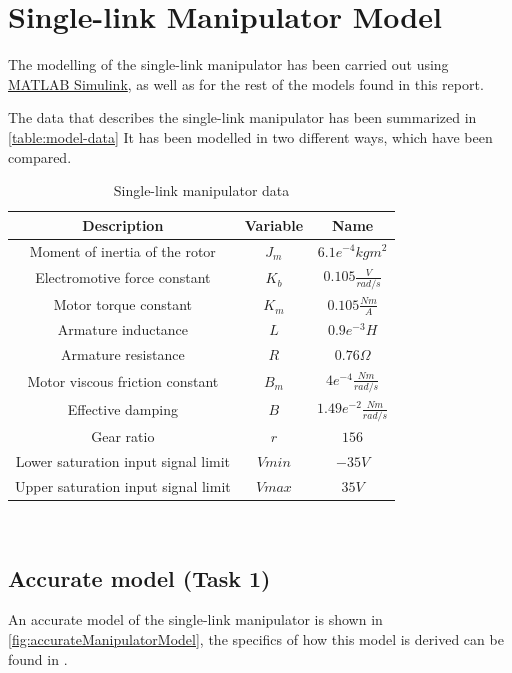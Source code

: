 \section{Single-link Manipulator Model}
The modelling of the single-link manipulator has been carried out using
\href{https://www.mathworks.com/products/simulink.html}{MATLAB Simulink}, as
well as for the rest of the models found in this report.

The data that describes the single-link manipulator has been summarized in
\autoref{table:model-data} It has been modelled in two different ways, which
have been compared.

\begin{table}
\centering
\begin{tabular}{c | c | c}
    Description & Variable & Name \\
    \hline\hline
    Moment of inertia of the rotor & $J_m$ & $6.1e^{-4} kg m^2$ \\
    \hline
    Electromotive force constant & $K_b$ & $0.105 \frac{V}{rad/s}$ \\
    \hline
    Motor torque constant & $K_m$ & $0.105 \frac{N m}{A}$ \\
    \hline
    Armature inductance & $L$ & $0.9e^{-3} H$ \\
    \hline
    Armature resistance & $R$ & $0.76 \Omega$ \\
    \hline
    Motor viscous friction constant & $B_m$ & $4e^{-4} \frac{N m}{rad/s}$ \\
    \hline
    Effective damping & $B$ & $1.49e^{-2} \frac{N m}{rad/s}$ \\
    \hline
    Gear ratio & $r$ & $156$ \\
    \hline
    Lower saturation input signal limit & $Vmin$ & $-35 V$ \\
    \hline
    Upper saturation input signal limit & $Vmax$ & $35 V$ \\
    \hline
\end{tabular}
\\ [1ex]
\caption{Single-link manipulator data}
\label{table:model-data}
\end{table}

\subsection{Accurate model (Task 1)}
\label{subsec:accurate-model}
An accurate model of the single-link manipulator is shown in
\autoref{fig:accurateManipulatorModel}, the specifics of how this model is
derived can be found in  \cite{SingleLink}.


